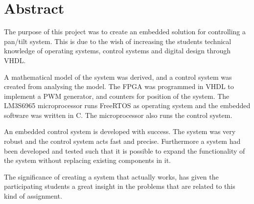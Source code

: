 \chapter*{Abstract}
The purpose of this project was to create an embedded solution for controlling a pan/tilt system. This is due to the wish of increasing the students technical knowledge of operating systems, control systems and digital design through VHDL.

A mathematical model of the system was derived, and a control system was created from analysing the model. The FPGA was programmed in VHDL to implement a PWM generator, and counters for position of the system. The LM3S6965 microprocessor runs FreeRTOS as operating system and the embedded software was written in C. The microprocessor also runs the control system.

An embedded control system is developed with success. The system was very robust and the control system acts fast and precise. Furthermore a system had been developed and tested such that it is possible to expand the functionality of the system without replacing existing components in it.

The significance of creating a system that actually works, has given the participating students a great insight in the problems that are related to this kind of assignment.